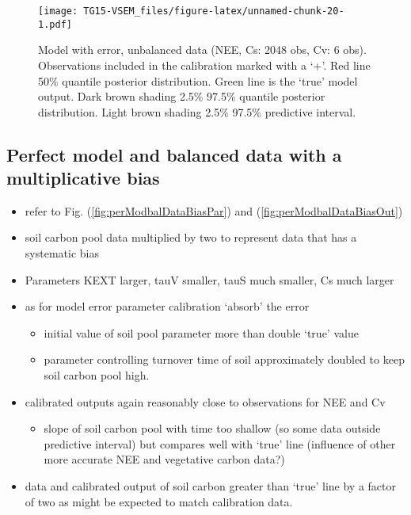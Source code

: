 \documentclass[]{article}
\providecommand{\tightlist}{%
  \setlength{\itemsep}{0pt}\setlength{\parskip}{0pt}}
\begin{document}
\begin{figure}
\centering
\texttt{[image: TG15-VSEM\_files/figure-latex/unnamed-chunk-20-1.pdf]}
\caption{\label{fig:errModunbalDataOut}Model with error, unbalanced data
(NEE, Cs: 2048 obs, Cv: 6 obs). Observations included in the calibration
marked with a `+'. Red line 50\% quantile posterior distribution. Green
line is the `true' model output. Dark brown shading 2.5\% 97.5\%
quantile posterior distribution. Light brown shading 2.5\% 97.5\%
predictive interval.}
\end{figure}

\subsection{Perfect model and balanced data with a multiplicative
bias}\label{perfect-model-and-balanced-data-with-a-multiplicative-bias}

\begin{itemize}
\tightlist
\item
  refer to Fig. (\ref{fig:perModbalDataBiasPar}) and
  (\ref{fig:perModbalDataBiasOut})
\item
  soil carbon pool data multiplied by two to represent data that has a
  systematic bias
\item
  Parameters KEXT larger, tauV smaller, tauS much smaller, Cs much
  larger
\item
  as for model error parameter calibration `absorb' the error

  \begin{itemize}
  \tightlist
  \item
    initial value of soil pool parameter more than double `true' value
  \item
    parameter controlling turnover time of soil approximately doubled to
    keep soil carbon pool high.
  \end{itemize}
\item
  calibrated outputs again reasonably close to observations for NEE and
  Cv

  \begin{itemize}
  \tightlist
  \item
    slope of soil carbon pool with time too shallow (so some data
    outside predictive interval) but compares well with `true' line
    (influence of other more accurate NEE and vegetative carbon data?)
  \end{itemize}
\item
  data and calibrated output of soil carbon greater than `true' line by
  a factor of two as might be expected to match calibration data.
\end{itemize}
\end{document}
